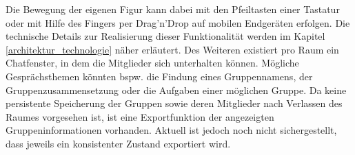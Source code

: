 Die Bewegung der eigenen Figur kann dabei mit den Pfeiltasten einer Tastatur oder mit Hilfe des Fingers per Drag'n'Drop auf mobilen Endgeräten erfolgen. Die technische Details zur Realisierung dieser Funktionalität werden im Kapitel \ref{architektur_technologie} näher erläutert. 
\newline\newline
Des Weiteren existiert pro Raum ein Chatfenster, in dem die Mitglieder sich unterhalten können. Mögliche Gesprächsthemen könnten bspw. die Findung eines Gruppennamens, der Gruppenzusammensetzung oder die Aufgaben einer möglichen Gruppe. Da keine persistente Speicherung der Gruppen sowie deren Mitglieder nach Verlassen des Raumes vorgesehen ist, ist eine Exportfunktion der angezeigten Gruppeninformationen vorhanden. Aktuell ist jedoch noch nicht sichergestellt, dass jeweils ein konsistenter Zustand exportiert wird.